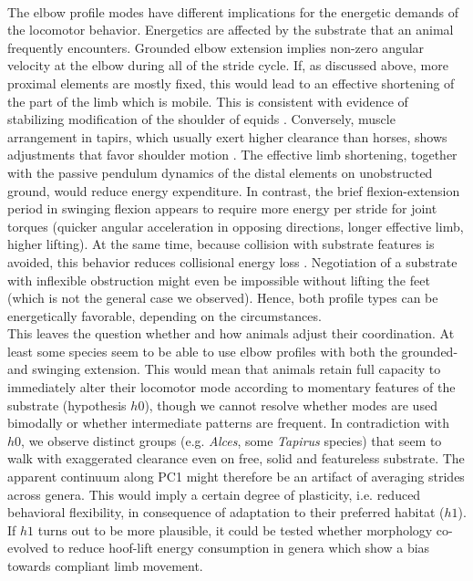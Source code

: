 \documentclass[10pt, a4paper]{article}
\begin{document}
\\The elbow profile modes have different implications for the energetic demands of the locomotor behavior. 
Energetics are affected by the substrate that an animal frequently encounters. 
Grounded elbow extension implies non-zero angular velocity at the elbow during all of the stride cycle. 
If, as discussed above, more proximal elements are mostly fixed, this would lead to an effective shortening of the part of the limb which is mobile. 
This is consistent with evidence of stabilizing modification of the shoulder of equids \citep[][]{Hermanson1992}. 
Conversely, muscle arrangement in tapirs, which usually exert higher clearance than horses, shows adjustments that favor shoulder motion \citep{MacLaren2016}. 
The effective limb shortening, together with the passive pendulum dynamics of the distal elements on unobstructed ground, would reduce energy expenditure. 
In contrast, the brief flexion-extension period in swinging flexion appears to require more energy per stride for joint torques (quicker angular acceleration in opposing directions, longer effective limb, higher lifting). 
At the same time, because collision with substrate features is avoided, this behavior reduces collisional energy loss \citep[i.e. loss from collision with superficial vegetation or rubble, which has to be distinguished from the collisional models in][]{Ruina2005}. 
Negotiation of a substrate with inflexible obstruction might even be impossible without lifting the feet (which is not the general case we observed). 
Hence, both profile types can be energetically favorable, depending on the circumstances. 
\\This leaves the question whether and how animals adjust their coordination. 
At least some species seem to be able to use elbow profiles with both the grounded- and swinging extension. 
This would mean that animals retain full capacity to immediately alter their locomotor mode according to momentary features of the substrate (hypothesis $h0$), though we cannot resolve whether modes are used bimodally or whether intermediate patterns are frequent. 
In contradiction with $h0$, we observe distinct groups (e.g. \textit{Alces}, some \textit{Tapirus} species) that seem to walk with exaggerated clearance even on free, solid and featureless substrate. 
The apparent continuum along PC1 might therefore be an artifact of averaging strides across genera. 
This would imply a certain degree of plasticity, i.e. reduced behavioral flexibility, in consequence of adaptation to their preferred habitat ($h1$). 
If $h1$ turns out to be more plausible, it could be tested whether morphology co-evolved to reduce hoof-lift energy consumption in genera which show a bias towards compliant limb movement. 
\end{document}

